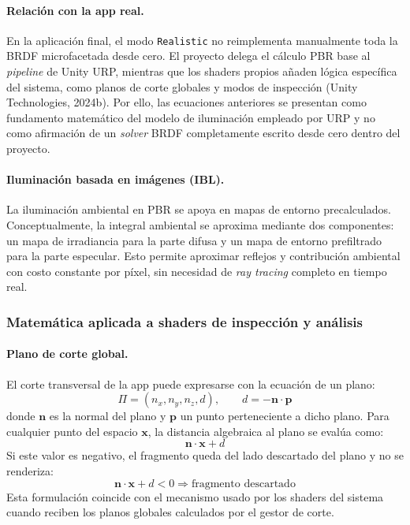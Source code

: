 \paragraph{Relaci\'on con la app real.}
En la aplicaci\'on final, el modo \texttt{Realistic} no reimplementa manualmente toda la BRDF microfacetada desde cero. El proyecto delega el c\'alculo PBR base al \textit{pipeline} de Unity URP, mientras que los shaders propios a\~naden l\'ogica espec\'ifica del sistema, como planos de corte globales y modos de inspecci\'on (Unity Technologies, 2024b). Por ello, las ecuaciones anteriores se presentan como fundamento matem\'atico del modelo de iluminaci\'on empleado por URP y no como afirmaci\'on de un \textit{solver} BRDF completamente escrito desde cero dentro del proyecto.

\paragraph{Iluminaci\'on basada en im\'agenes (IBL).}
La iluminaci\'on ambiental en PBR se apoya en mapas de entorno precalculados. Conceptualmente, la integral ambiental se aproxima mediante dos componentes: un mapa de irradiancia para la parte difusa y un mapa de entorno prefiltrado para la parte especular. Esto permite aproximar reflejos y contribuci\'on ambiental con costo constante por p\'ixel, sin necesidad de \textit{ray tracing} completo en tiempo real.

\subsubsection{Matem\'atica aplicada a shaders de inspecci\'on y an\'alisis}

\paragraph{Plano de corte global.}
El corte transversal de la app puede expresarse con la ecuaci\'on de un plano:
\[
\Pi = (n_x, n_y, n_z, d), \qquad d = -\mathbf{n}\cdot\mathbf{p}
\]
donde $\mathbf{n}$ es la normal del plano y $\mathbf{p}$ un punto perteneciente a dicho plano. Para cualquier punto del espacio $\mathbf{x}$, la distancia algebraica al plano se eval\'ua como:
\[
\mathbf{n}\cdot\mathbf{x} + d
\]
Si este valor es negativo, el fragmento queda del lado descartado del plano y no se renderiza:
\[
\mathbf{n}\cdot\mathbf{x} + d < 0 \Rightarrow \text{fragmento descartado}
\]
Esta formulaci\'on coincide con el mecanismo usado por los shaders del sistema cuando reciben los planos globales calculados por el gestor de corte.


